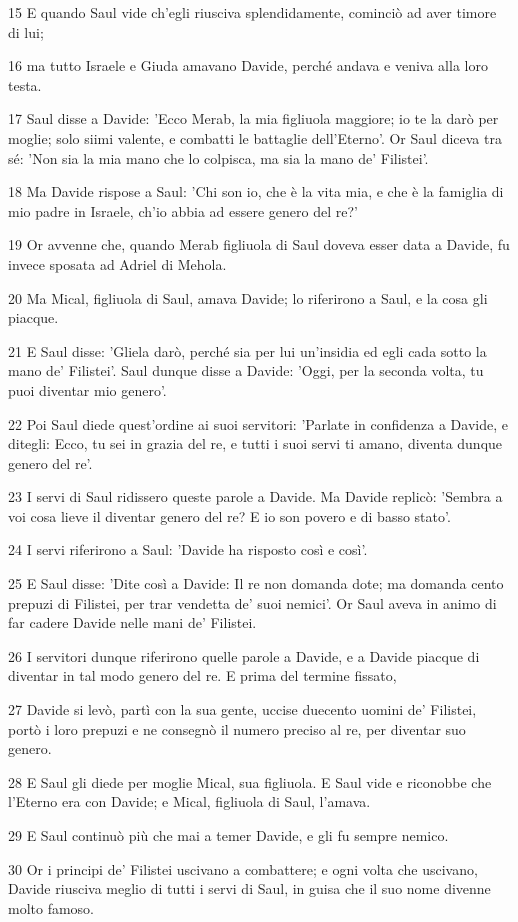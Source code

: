 \par 15 E quando Saul vide ch'egli riusciva splendidamente, cominciò ad aver timore di lui;
\par 16 ma tutto Israele e Giuda amavano Davide, perché andava e veniva alla loro testa.
\par 17 Saul disse a Davide: 'Ecco Merab, la mia figliuola maggiore; io te la darò per moglie; solo siimi valente, e combatti le battaglie dell'Eterno'. Or Saul diceva tra sé: 'Non sia la mia mano che lo colpisca, ma sia la mano de' Filistei'.
\par 18 Ma Davide rispose a Saul: 'Chi son io, che è la vita mia, e che è la famiglia di mio padre in Israele, ch'io abbia ad essere genero del re?'
\par 19 Or avvenne che, quando Merab figliuola di Saul doveva esser data a Davide, fu invece sposata ad Adriel di Mehola.
\par 20 Ma Mical, figliuola di Saul, amava Davide; lo riferirono a Saul, e la cosa gli piacque.
\par 21 E Saul disse: 'Gliela darò, perché sia per lui un'insidia ed egli cada sotto la mano de' Filistei'. Saul dunque disse a Davide: 'Oggi, per la seconda volta, tu puoi diventar mio genero'.
\par 22 Poi Saul diede quest'ordine ai suoi servitori: 'Parlate in confidenza a Davide, e ditegli: Ecco, tu sei in grazia del re, e tutti i suoi servi ti amano, diventa dunque genero del re'.
\par 23 I servi di Saul ridissero queste parole a Davide. Ma Davide replicò: 'Sembra a voi cosa lieve il diventar genero del re? E io son povero e di basso stato'.
\par 24 I servi riferirono a Saul: 'Davide ha risposto così e così'.
\par 25 E Saul disse: 'Dite così a Davide: Il re non domanda dote; ma domanda cento prepuzi di Filistei, per trar vendetta de' suoi nemici'. Or Saul aveva in animo di far cadere Davide nelle mani de' Filistei.
\par 26 I servitori dunque riferirono quelle parole a Davide, e a Davide piacque di diventar in tal modo genero del re. E prima del termine fissato,
\par 27 Davide si levò, partì con la sua gente, uccise duecento uomini de' Filistei, portò i loro prepuzi e ne consegnò il numero preciso al re, per diventar suo genero.
\par 28 E Saul gli diede per moglie Mical, sua figliuola. E Saul vide e riconobbe che l'Eterno era con Davide; e Mical, figliuola di Saul, l'amava.
\par 29 E Saul continuò più che mai a temer Davide, e gli fu sempre nemico.
\par 30 Or i principi de' Filistei uscivano a combattere; e ogni volta che uscivano, Davide riusciva meglio di tutti i servi di Saul, in guisa che il suo nome divenne molto famoso.


